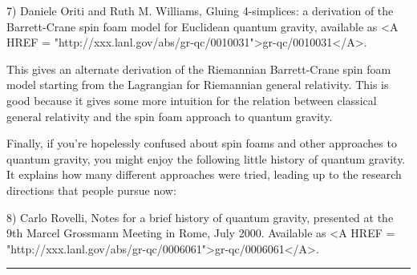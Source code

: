 7) Daniele Oriti and Ruth M. Williams, Gluing 4-simplices: a derivation
of the Barrett-Crane spin foam model for Euclidean quantum gravity,
available as <A HREF =
"http://xxx.lanl.gov/abs/gr-qc/0010031">gr-qc/0010031</A>.

This gives an alternate derivation of the Riemannian Barrett-Crane spin 
foam model starting from the Lagrangian for Riemannian general relativity.
This is good because it gives some more intuition for the relation between
classical general relativity and the spin foam approach to quantum gravity.

Finally, if you're hopelessly confused about spin foams and other
approaches to quantum gravity, you might enjoy the following little
history of quantum gravity.  It explains how many different approaches
were tried, leading up to the research directions that people pursue
now:

8) Carlo Rovelli, Notes for a brief history of quantum gravity,
presented at the 9th Marcel Grossmann Meeting in Rome, July 2000.
Available as <A HREF =
"http://xxx.lanl.gov/abs/gr-qc/0006061">gr-qc/0006061</A>.











 \par\noindent\rule{\textwidth}{0.4pt}

